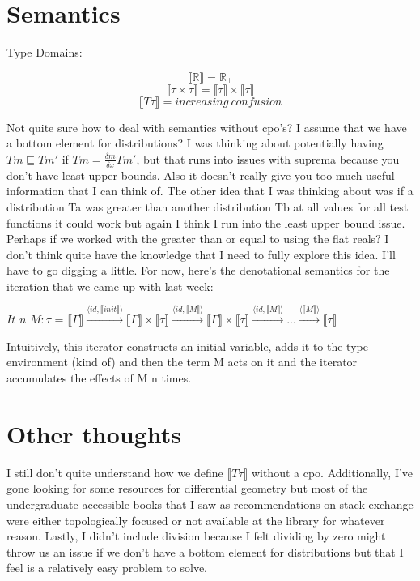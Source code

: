 \documentclass{article}
\begin{document}
    \section{Semantics}
    Type Domains:
    \begin{center}
        $$\llbracket \mathbb{R} \rrbracket = \mathbb{R}_\bot$$
        $$\llbracket \tau \times \tau \rrbracket = \llbracket \tau \rrbracket \times \llbracket \tau \rrbracket$$
        $$\llbracket T\tau \rrbracket = increasing\ confusion$$
    \end{center}
    Not quite sure how to deal with semantics without cpo's? I assume that we have a bottom element for distributions? I was thinking about potentially having $Tm \sqsubseteq Tm'$ if $Tm = \frac{\delta m}{\delta x} Tm'$, but that runs into issues with suprema because you don't have least upper bounds. Also it doesn't really give you too much useful information that I can think of. The other idea that I was thinking about was if a distribution Ta was greater than another distribution Tb at all values for all test functions it could work but again I think I run into the least upper bound issue. Perhaps if we worked with the greater than or equal to using the flat reals? I don't think quite have the knowledge that I need to fully explore this idea. I'll have to go digging a little. For now, here's the denotational semantics for the iteration that we came up with last week:
    \begin{center}
        $It$ $n$ $M:\tau$ = $\llbracket \Gamma \rrbracket \xrightarrow{\langle id, \llbracket init \rrbracket \rangle}\llbracket \Gamma \rrbracket \times \llbracket \tau \rrbracket \xrightarrow{\langle id, \llbracket M \rrbracket \rangle}\llbracket \Gamma \rrbracket \times \llbracket \tau \rrbracket \xrightarrow{\langle id, \llbracket M \rrbracket \rangle}... \xrightarrow{\langle \llbracket M \rrbracket \rangle} \llbracket \tau \rrbracket$
    \end{center}
    Intuitively, this iterator constructs an initial variable, adds it to the type environment (kind of) and then the term M acts on it and the iterator accumulates the effects of M n times. 
    \section{Other thoughts}
    I still don't quite understand how we define $\llbracket T\tau \rrbracket$ without a cpo. Additionally, I've gone looking for some resources for differential geometry but most of the undergraduate accessible books that I saw as recommendations on stack exchange were either topologically focused or not available at the library for whatever reason. Lastly, I didn't include division because I felt dividing by zero might throw us an issue if we don't have a bottom element for distributions but that I feel is a relatively easy problem to solve. 
    
\end{document}

